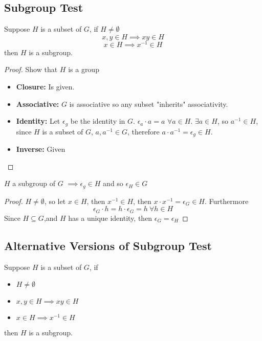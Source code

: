 \documentclass[openany]{report}
\begin{document}
\subsection{Subgroup Test}
\begin{prop}
Suppose $H$ is a subset of $G$, if $H \neq \emptyset$
$$x,y \in H \implies xy \in H$$
$$x \in H \implies x^{-1} \in H$$
then $H$ is a subgroup.
\end{prop}
\begin{proof}
    Show that $H$ is a group
    \begin{itemize}
        \item \textbf{Closure:} Is given.
        \item \textbf{Associative:} $G$ is associative so any subset "inherits" associativity.
        \item \textbf{Identity:} Let $\epsilon_g$ be the identity in $G$. $\epsilon_a \cdot a  = a$ $\forall a \in H$. $\exists a \in H$, so $a^{-1} \in H$, since $H$ is a subset of $G$, $a, a^{-1} \in G$, therefore $a \cdot a^{-1} = \epsilon_g \in H$.
        \item \textbf{Inverse:} Given
    \end{itemize}
\end{proof}

\begin{prop}
    $H$ a subgroup of $G$ $\implies \epsilon_g \in H$ and so $\epsilon_H \in G$
\end{prop}
\begin{proof}
    $H \neq \emptyset$, so let $x \in H$, then $x^{-1} \in H$, then $x \cdot x^{-1} = \epsilon_G \in H$. Furthermore
    $$\epsilon_G \cdot h = h \cdot \epsilon_G = h \ \forall h \in H$$
    Since $H \subseteq G$,and $H$ has a unique identity, then $\epsilon_G = \epsilon_H$
\end{proof}
\subsection{Alternative Versions of Subgroup Test}
Suppose $H$ is a subset of $G$, if
\begin{itemize}
    \item  $H \neq \emptyset$
    \item $x,y \in H \implies xy \in H$
    \item $x \in H \implies x^{-1} \in H$
\end{itemize}
then $H$ is a subgroup.

\end{document}
